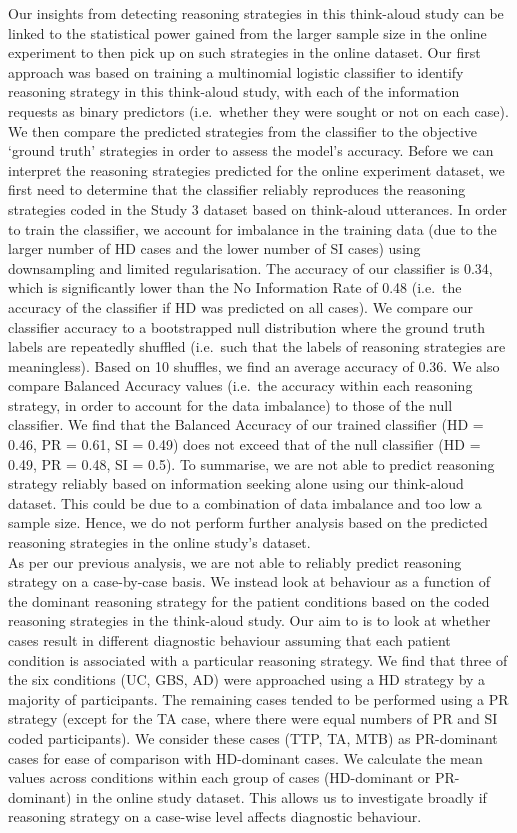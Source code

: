 \documentclass[a4paper, nobind]{templates/ociamthesis}
\begin{document}
Our insights from detecting reasoning strategies in this think-aloud study can be linked to the statistical power gained from the larger sample size in the online experiment to then pick up on such strategies in the online dataset. Our first approach was based on training a multinomial logistic classifier to identify reasoning strategy in this think-aloud study, with each of the information requests as binary predictors (i.e.~whether they were sought or not on each case). We then compare the predicted strategies from the classifier to the objective `ground truth' strategies in order to assess the model's accuracy. Before we can interpret the reasoning strategies predicted for the online experiment dataset, we first need to determine that the classifier reliably reproduces the reasoning strategies coded in the Study 3 dataset based on think-aloud utterances. In order to train the classifier, we account for imbalance in the training data (due to the larger number of HD cases and the lower number of SI cases) using downsampling and limited regularisation. The accuracy of our classifier is 0.34, which is significantly lower than the No Information Rate of 0.48 (i.e.~the accuracy of the classifier if HD was predicted on all cases). We compare our classifier accuracy to a bootstrapped null distribution where the ground truth labels are repeatedly shuffled (i.e.~such that the labels of reasoning strategies are meaningless). Based on 10 shuffles, we find an average accuracy of 0.36. We also compare Balanced Accuracy values (i.e.~the accuracy within each reasoning strategy, in order to account for the data imbalance) to those of the null classifier. We find that the Balanced Accuracy of our trained classifier (HD = 0.46, PR = 0.61, SI = 0.49) does not exceed that of the null classifier (HD = 0.49, PR = 0.48, SI = 0.5). To summarise, we are not able to predict reasoning strategy reliably based on information seeking alone using our think-aloud dataset. This could be due to a combination of data imbalance and too low a sample size. Hence, we do not perform further analysis based on the predicted reasoning strategies in the online study's dataset.\\

As per our previous analysis, we are not able to reliably predict reasoning strategy on a case-by-case basis. We instead look at behaviour as a function of the dominant reasoning strategy for the patient conditions based on the coded reasoning strategies in the think-aloud study. Our aim to is to look at whether cases result in different diagnostic behaviour assuming that each patient condition is associated with a particular reasoning strategy. We find that three of the six conditions (UC, GBS, AD) were approached using a HD strategy by a majority of participants. The remaining cases tended to be performed using a PR strategy (except for the TA case, where there were equal numbers of PR and SI coded participants). We consider these cases (TTP, TA, MTB) as PR-dominant cases for ease of comparison with HD-dominant cases. We calculate the mean values across conditions within each group of cases (HD-dominant or PR-dominant) in the online study dataset. This allows us to investigate broadly if reasoning strategy on a case-wise level affects diagnostic behaviour.
\end{document}
